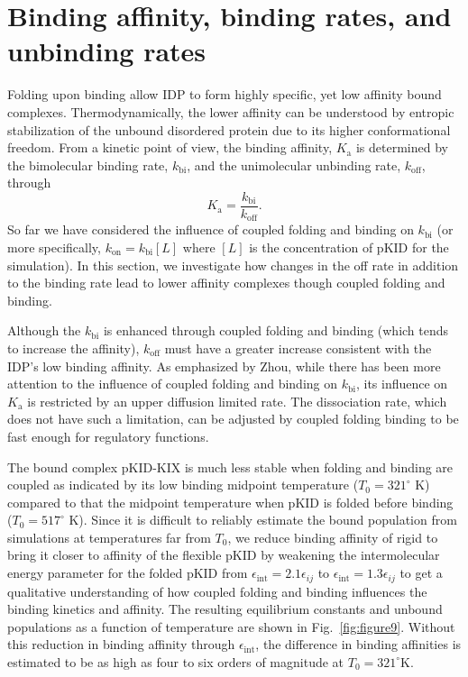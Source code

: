 \documentclass[../talant.diss.submit.tex]{subfiles}
\begin{document}
\section{\textbf{Binding affinity, binding rates, and unbinding rates}}\label{sect:three_six}
%
Folding upon binding allow IDP to form highly specific, yet low affinity bound
complexes\cite{dyson:05,hsu:13ex,tompa:08f}.  Thermodynamically, the lower
affinity can be understood by entropic stabilization of the unbound disordered
protein due to its higher conformational freedom. From a kinetic point of view,
the binding affinity, $K_\mathrm{a}$ is determined by the bimolecular binding
rate, $k_\mathrm{bi}$, and the unimolecular unbinding rate, $k_\mathrm{off}$,
through
\begin{equation}
  \label{eq:Ka}
  K_\mathrm{a} = \frac{k_\mathrm{bi}}{k_\mathrm{off}}.
\end{equation}
So far we have considered the influence of coupled folding and binding on
$k_\mathrm{bi}$ (or more specifically, $k_\mathrm{on} = k_\mathrm{bi}[L]$ where
$[L]$ is the concentration of pKID for the simulation). In this section, we
investigate how changes in the off rate in addition to the binding rate lead to
lower affinity complexes though coupled folding and binding.

Although the $k_\mathrm{bi}$ is enhanced through coupled folding and binding
(which tends to increase the affinity), $k_\mathrm{off}$ must have a greater
increase consistent with the IDP's low binding affinity. As emphasized by Zhou,
while there has been more attention to the influence of coupled folding and
binding on $k_\mathrm{bi}$, its influence on $K_\mathrm{a}$ is restricted by an
upper diffusion limited rate. The dissociation rate, which does not have such a
limitation, can be adjusted by coupled folding binding to be fast enough for
regulatory functions.\cite{zhou:12}

The bound complex pKID-KIX is much less stable when folding and binding are
coupled as indicated by its low binding midpoint temperature ($T_0=321^\circ$ K)
compared to that the midpoint temperature when pKID is folded before binding
($T_0=517^\circ$ K).  Since it is difficult to reliably estimate the bound
population from simulations at temperatures far from $T_0$, we reduce binding
affinity of rigid to bring it closer to affinity of the flexible pKID by
weakening the intermolecular energy parameter for the folded pKID from
$\epsilon_{\mathrm{int}}=2.1\epsilon_{ij}$ to
$\epsilon_{\mathrm{int}}=1.3\epsilon_{ij}$ to get a qualitative understanding of
how coupled folding and binding influences the binding kinetics and affinity.
The resulting equilibrium constants and unbound populations as a function of
temperature are shown in Fig.~\ref{fig:figure9}.  Without this reduction in
binding affinity through $\epsilon_{\mathrm{int}}$, the difference in binding
affinities is estimated to be as high as four to six orders of magnitude at
$T_0=321^\circ$K.
\end{document}
